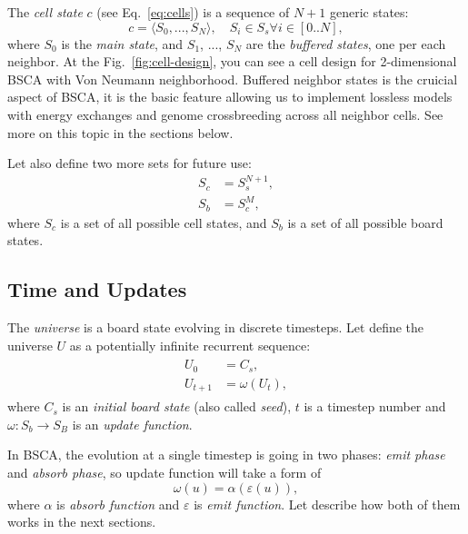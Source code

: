 \documentclass[a4paper,12pt,tikz,UTF8]{article}
\begin{document}
    The \textit{cell state} $c$ (see Eq.~\ref{eq:cells}) is a sequence of $N + 1$ generic states:
    \begin{equation}
      \label{eq:cell-state}
      c = \langle S_0, ..., S_N \rangle, \quad S_i \in S_s \forall i \in {[0 .. N]},
    \end{equation}
    where $S_0$ is the \textit{main state}, and $S_1$, ..., $S_N$ are the \textit{buffered states}, one per each neighbor. At the Fig.~\ref{fig:cell-design}, you can see a cell design for 2-dimensional BSCA with Von Neumann neighborhood. Buffered neighbor states is the cruicial aspect of BSCA, it is the basic feature allowing us to implement lossless models with energy exchanges and genome crossbreeding across all neighbor cells. See more on this topic in the sections below.

    Let also define two more sets for future use:
    \begin{align}
      S_c &= S_s^{N + 1},\\
      S_b &= S_c^M,
    \end{align}
    where $S_c$ is a set of all possible cell states, and $S_b$ is a set of all possible board states.

  \subsection{Time and Updates}

    The \textit{universe} is a board state evolving in discrete timesteps. Let define the universe $U$ as a potentially infinite recurrent sequence:
    \begin{align}
      \begin{split}
        U_0 &= C_s,\\
        U_{t + 1} &= \omega(U_t),
      \end{split}
    \end{align}
    where $C_s$ is an \textit{initial board state} (also called \textit{seed}), $t$ is a timestep number and $\omega: S_b \to S_B$ is an \textit{update function}.

    In BSCA, the evolution at a single timestep is going in two phases: \textit{emit phase} and \textit{absorb phase}, so update function will take a form of
    \begin{equation}
      \omega(u) = \alpha(\varepsilon(u)),
    \end{equation}
    where $\alpha$ is \textit{absorb function} and $\varepsilon$ is \textit{emit function}. Let describe how both of them works in the next sections.
\end{document}
